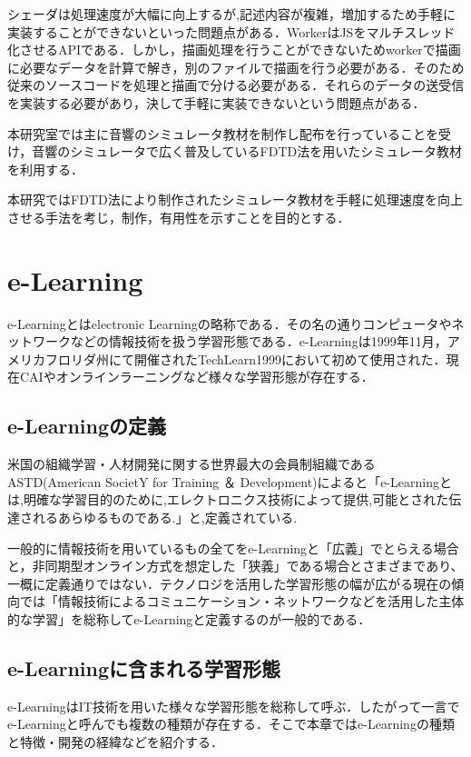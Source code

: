 \documentclass[a4j,12pt]{jsarticle}
\begin{document}
シェーダは処理速度が大幅に向上するが,記述内容が複雑，増加するため手軽に実装することができないといった問題点がある．WorkerはJSをマルチスレッド化させるAPIである．しかし，描画処理を行うことができないためworkerで描画に必要なデータを計算で解き，別のファイルで描画を行う必要がある．そのため従来のソースコードを処理と描画で分ける必要がある．それらのデータの送受信を実装する必要があり，決して手軽に実装できないという問題点がある．

本研究室では主に音響のシミュレータ教材を制作し配布を行っていることを受け，音響のシミュレータで広く普及しているFDTD法を用いたシミュレータ教材を利用する．


本研究ではFDTD法により制作されたシミュレータ教材を手軽に処理速度を向上させる手法を考じ，制作，有用性を示すことを目的とする．

\newpage
\section{e-Learning}
e-Learningとはelectronic Learningの略称である．その名の通りコンピュータやネットワークなどの情報技術を扱う学習形態である．e-Learningは1999年11月，アメリカフロリダ州にて開催されたTechLearn1999において初めて使用された．現在CAIやオンラインラーニングなど様々な学習形態が存在する． 

\subsection{e-Learningの定義}
米国の組織学習・人材開発に関する世界最大の会員制組織であるASTD(American SocietY for Training ＆ Development)によると「e-Learningとは,明確な学習目的のために,エレクトロニクス技術によって提供,可能とされた伝達されるあらゆるものである.」と,定義されている.

一般的に情報技術を用いているもの全てをe-Learningと「広義」でとらえる場合と，非同期型オンライン方式を想定した「狭義」である場合とさまざまであり、一概に定義通りではない．テクノロジを活用した学習形態の幅が広がる現在の傾向では「情報技術によるコミュニケーション・ネットワークなどを活用した主体的な学習」を総称してe-Learningと定義するのが一般的である．

\subsection{e-Learningに含まれる学習形態}
e-LearningはIT技術を用いた様々な学習形態を総称して呼ぶ．したがって一言でe-Learningと呼んでも複数の種類が存在する．そこで本章ではe-Learningの種類と特徴・開発の経緯などを紹介する．
\end{document}
